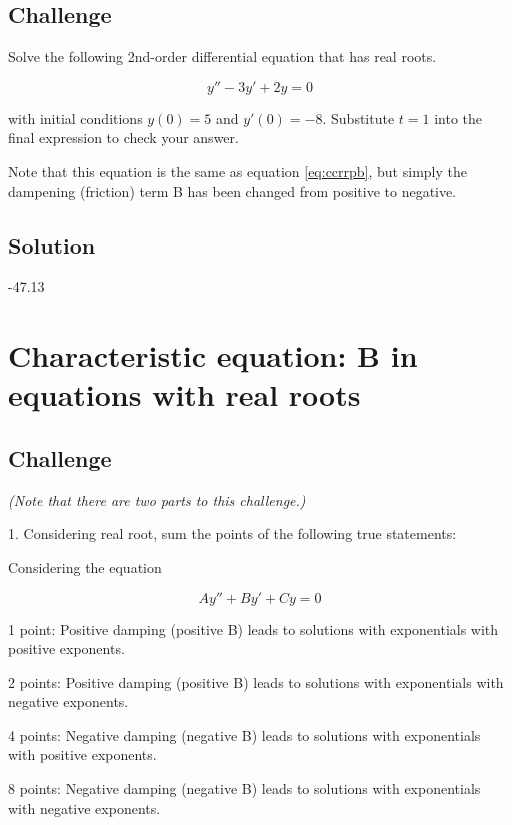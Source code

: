 \subsection*{Challenge}
Solve the following 2nd-order differential equation that has real roots. 

\begin{equation}
    y'' - 3 y' + 2 y = 0
\end{equation}

with initial conditions $y(0)=5$ and $y'(0)=-8$. Substitute $t=1$ into the final expression to check your answer.

Note that this equation is the same as equation \ref{eq:ccrrpb}, but simply the dampening (friction) term B has been changed from positive to negative.


\subsection*{Solution}
-47.13 %




\newpage
\section{Characteristic equation: B in equations with real roots}

\subsection*{Challenge}

\emph{(Note that there are two parts to this challenge.)}

1. Considering real root, sum the points of the following true statements:

Considering the equation

\begin{equation}
    A y'' + B y' + C y = 0
\end{equation}

1 point: Positive damping (positive B) leads to solutions with exponentials with positive exponents.

2 points: Positive damping (positive B) leads to solutions with exponentials with negative exponents.

4 points: Negative damping (negative B) leads to solutions with exponentials with positive exponents.

8 points: Negative damping (negative B) leads to solutions with exponentials with negative exponents.

